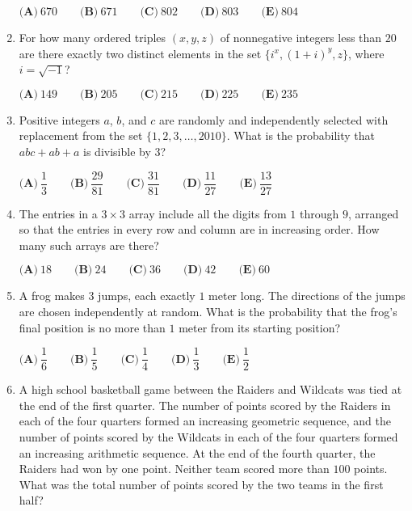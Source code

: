\documentclass{article}
\begin{document}
\begin{enumerate}[label=\arabic*., itemsep=0.5em]
$\textbf{(A)}\ 670 \qquad \textbf{(B)}\ 671 \qquad \textbf{(C)}\ 802 \qquad \textbf{(D)}\ 803 \qquad \textbf{(E)}\ 804$\par \vspace{0.5em}\item For how many ordered triples $(x,y,z)$ of nonnegative integers less than $20$ are there exactly two distinct elements in the set $\{i^x, (1+i)^y, z\}$, where $i=\sqrt{-1}$?

$\textbf{(A)}\ 149 \qquad \textbf{(B)}\ 205 \qquad \textbf{(C)}\ 215 \qquad \textbf{(D)}\ 225 \qquad \textbf{(E)}\ 235$\par \vspace{0.5em}\item Positive integers $a$, $b$, and $c$ are randomly and independently selected with replacement from the set $\{1, 2, 3,\dots, 2010\}$. What is the probability that $abc + ab + a$ is divisible by $3$?

$\textbf{(A)}\ \dfrac{1}{3} \qquad \textbf{(B)}\ \dfrac{29}{81} \qquad \textbf{(C)}\ \dfrac{31}{81} \qquad \textbf{(D)}\ \dfrac{11}{27} \qquad \textbf{(E)}\ \dfrac{13}{27}$\par \vspace{0.5em}\item The entries in a $3 \times 3$ array include all the digits from $1$ through $9$, arranged so that the entries in every row and column are in increasing order. How many such arrays are there?

$\textbf{(A)}\ 18 \qquad \textbf{(B)}\ 24 \qquad \textbf{(C)}\ 36 \qquad \textbf{(D)}\ 42 \qquad \textbf{(E)}\ 60$\par \vspace{0.5em}\item A frog makes $3$ jumps, each exactly $1$ meter long. The directions of the jumps are chosen independently at random. What is the probability that the frog's final position is no more than $1$ meter from its starting position?

$\textbf{(A)}\ \dfrac{1}{6} \qquad \textbf{(B)}\ \dfrac{1}{5} \qquad \textbf{(C)}\ \dfrac{1}{4} \qquad \textbf{(D)}\ \dfrac{1}{3} \qquad \textbf{(E)}\ \dfrac{1}{2}$\par \vspace{0.5em}\item A high school basketball game between the Raiders and Wildcats was tied at the end of the first quarter. The number of points scored by the Raiders in each of the four quarters formed an increasing geometric sequence, and the number of points scored by the Wildcats in each of the four quarters formed an increasing arithmetic sequence. At the end of the fourth quarter, the Raiders had won by one point. Neither team scored more than $100$ points. What was the total number of points scored by the two teams in the first half?


\end{enumerate}
\end{document}
